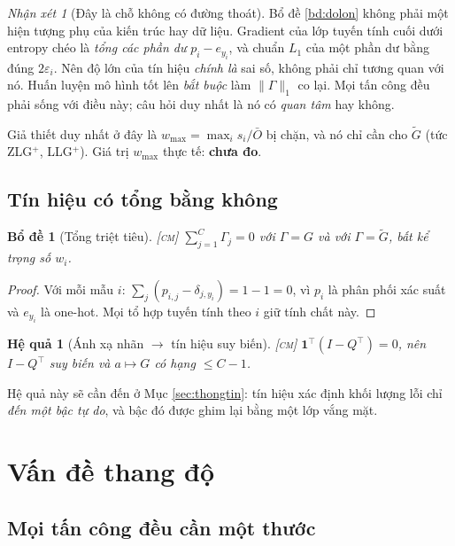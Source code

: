 \documentclass[11pt,a4paper]{article}
\newtheorem{bode}[dinhly]{Bổ đề}
\newtheorem{hequa}[dinhly]{Hệ quả}
\theoremstyle{remark}
\newtheorem{nhanxet}[dinhly]{Nhận xét}
\newcommand{\one}{\mathbf{1}}
\begin{document}
\begin{nhanxet}[Đây là chỗ không có đường thoát]
\label{nx:khongthoat}
Bổ đề \ref{bd:dolon} không phải một hiện tượng phụ của kiến trúc hay dữ liệu.
Gradient của lớp tuyến tính cuối dưới entropy chéo là \emph{tổng các phần dư}
$p_i-e_{y_i}$, và chuẩn $L_1$ của một phần dư bằng đúng $2\varepsilon_i$. Nên
độ lớn của tín hiệu \emph{chính là} sai số, không phải chỉ tương quan với nó.
Huấn luyện mô hình tốt lên \emph{bắt buộc} làm $\|\Gamma\|_1$ co lại. Mọi
tấn công đều phải sống với điều này; câu hỏi duy nhất là nó có \emph{quan
tâm} hay không.

Giả thiết duy nhất ở đây là $w_{\max}=\max_i s_i/\bar O$ bị chặn, và nó chỉ
cần cho $\tilde G$ (tức ZLG$^+$, LLG$^+$). Giá trị $w_{\max}$ thực tế:
\textbf{chưa đo}.
\end{nhanxet}

\subsection{Tín hiệu có tổng bằng không}

\begin{bode}[Tổng triệt tiêu]
\label{bd:tongkhong}
\textsc{[cm]}\; $\sum_{j=1}^{C}\Gamma_j=0$ với $\Gamma=G$ \emph{và} với
$\Gamma=\tilde G$, bất kể trọng số $w_i$.
\end{bode}

\begin{proof}
Với mỗi mẫu $i$: $\sum_j (p_{i,j}-\delta_{j,y_i})=1-1=0$, vì $p_i$ là phân
phối xác suất và $e_{y_i}$ là one-hot. Mọi tổ hợp tuyến tính theo $i$ giữ
tính chất này.
\end{proof}

\begin{hequa}[Ánh xạ nhãn $\to$ tín hiệu suy biến]
\label{hq:hatnhan}
\textsc{[cm]}\; $\one^{\!\top}(I-Q^{\!\top})=0$, nên $I-Q^{\!\top}$ suy biến
và $a\mapsto G$ có hạng $\le C-1$.
\end{hequa}

Hệ quả này sẽ cần đến ở Mục \ref{sec:thongtin}: tín hiệu xác định khối lượng
lỗi chỉ \emph{đến một bậc tự do}, và bậc đó được ghim lại bằng một lớp vắng
mặt.

\section{Vấn đề thang độ}
\label{sec:thangdo}

\subsection{Mọi tấn công đều cần một thước}
\end{document}
